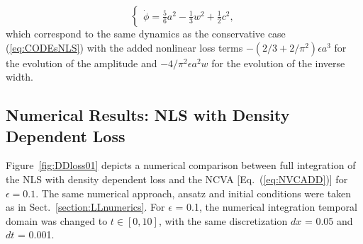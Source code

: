 {{\begin{equation}
\begin{cases}
\dot{\phi} = \frac{5}{6} a^2 - \frac{1}{3} w^2 + \frac{1}{2} c^2, \end{cases}
 \label{eq:NVCADD}
 \end{equation}}
which correspond to the same dynamics as the conservative case (\ref{eq:CODEsNLS}) with the
added nonlinear loss terms $-(2/3 + 2/\pi^2 )\epsilon a^3$ for the evolution of the amplitude
and $-4/\pi^2 \epsilon a^2 w$ for the evolution of the inverse width.  
 
\subsection{Numerical Results: NLS with Density Dependent Loss}
Figure~\ref{fig:DDloss01} depicts a numerical comparison between full integration of the NLS with density dependent loss and the NCVA [Eq.~(\ref{eq:NVCADD})] for $\epsilon = 0.1$.  The same numerical approach, ansatz and initial conditions were taken as in Sect.~\ref{section:LLnumerics}.  
For $\epsilon$ = 0.1, the numerical integration temporal domain was changed to $t\in[0,10]$, with the same discretization $dx$ = 0.05 and $dt$ = 0.001.


}
